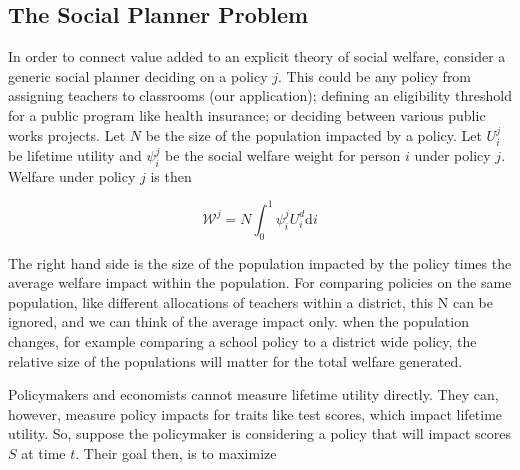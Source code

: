 \documentclass[12pt]{article}
\theoremstyle{definition}
\theoremstyle{definition}
\theoremstyle{definition}
\theoremstyle{definition}
\begin{document}
\subsection{The Social Planner Problem}

    
    
    
    In order to connect value added to an explicit theory of social welfare, consider a generic social planner deciding on a policy $j$. This could be any policy from assigning teachers to classrooms (our application);  defining an eligibility threshold for a public program like health insurance; or deciding between various public works projects. Let $N$ be the size of the population impacted by a policy. Let $U^j_i$ be lifetime utility and $\psi^j_i$ be the social welfare weight for person $i$ under policy $j$. Welfare under policy $j$ is then
        
        \begin{equation}
        \mathcal{W}^j = N \int_0^1 \psi^j_i U^d_i \text{d}i
        \end{equation}
    
    The right hand side is the size of the population impacted by the policy times the average welfare impact within the population. For comparing policies on the same population, like different allocations of teachers within a district, this N can be ignored, and we can think of the average impact only. when the population changes, for example comparing a school policy to a district wide policy, the relative size of the populations will matter for the total welfare generated. 




  Policymakers and economists cannot measure lifetime utility directly. They can, however, measure policy impacts for traits like test scores, which impact lifetime utility. So, suppose the policymaker is considering a policy that will impact scores $S$ at time $t$. Their goal then, is to maximize 
 
\end{document}
